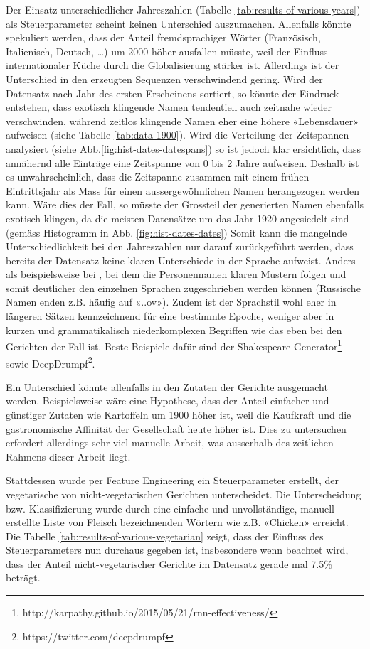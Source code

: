 Der Einsatz unterschiedlicher Jahreszahlen (Tabelle \ref{tab:results-of-various-years}) als Steuerparameter scheint keinen Unterschied auszumachen.
Allenfalls könnte spekuliert werden, dass der Anteil fremdsprachiger Wörter (Französisch, Italienisch, Deutsch, …) um 2000 höher ausfallen müsste,
weil der Einfluss internationaler Küche durch die Globalisierung stärker ist.
Allerdings ist der Unterschied in den erzeugten Sequenzen verschwindend gering.
Wird der Datensatz nach Jahr des ersten Erscheinens sortiert, so könnte der Eindruck entstehen,
dass exotisch klingende Namen tendentiell auch zeitnahe wieder verschwinden, während zeitlos klingende
Namen eher eine höhere «Lebensdauer» aufweisen (siehe Tabelle \ref{tab:data-1900}).
Wird die Verteilung der Zeitspannen analysiert (siehe Abb.\ref{fig:hist-dates-datespans}) so ist jedoch klar ersichtlich,
dass annähernd alle Einträge eine Zeitspanne von 0 bis 2 Jahre aufweisen.
Deshalb ist es unwahrscheinlich, dass die Zeitspanne zusammen mit einem frühen Eintrittsjahr als Mass für einen
aussergewöhnlichen Namen herangezogen werden kann.
Wäre dies der Fall, so müsste der Grossteil der generierten Namen ebenfalls exotisch klingen, da die meisten Datensätze
um das Jahr 1920 angesiedelt sind (gemäss Histogramm in Abb. \ref{fig:hist-dates-dates})
Somit kann die mangelnde Unterschiedlichkeit bei den Jahreszahlen nur darauf zurückgeführt werden, dass bereits
der Datensatz keine klaren Unterschiede in der Sprache aufweist.
Anders als beispielsweise bei \autocite{robertson}, bei dem die Personennamen klaren Mustern folgen und somit deutlicher
den einzelnen Sprachen zugeschrieben werden können (Russische Namen enden z.B. häufig auf «..ov»).
Zudem ist der Sprachstil wohl eher in längeren Sätzen kennzeichnend für eine bestimmte Epoche, weniger aber in kurzen und
grammatikalisch niederkomplexen Begriffen wie das eben bei den Gerichten der Fall ist.
Beste Beispiele dafür sind der Shakespeare-Generator\footnote{http://karpathy.github.io/2015/05/21/rnn-effectiveness/} sowie DeepDrumpf\footnote{https://twitter.com/deepdrumpf}.

Ein Unterschied könnte allenfalls in den Zutaten der Gerichte ausgemacht werden.
Beispielsweise wäre eine Hypothese, dass der Anteil einfacher und günstiger Zutaten wie Kartoffeln um 1900 höher ist, weil
die Kaufkraft und die gastronomische Affinität der Gesellschaft heute höher ist.
Dies zu untersuchen erfordert allerdings sehr viel manuelle Arbeit, was ausserhalb des zeitlichen Rahmens dieser Arbeit liegt.

Stattdessen wurde per Feature Engineering ein Steuerparameter erstellt, der vegetarische von nicht-vegetarischen Gerichten unterscheidet.
Die Unterscheidung bzw. Klassifizierung wurde durch eine einfache und unvollständige, manuell erstellte Liste von Fleisch bezeichnenden Wörtern wie z.B. «Chicken» erreicht.
Die Tabelle \ref{tab:results-of-various-vegetarian} zeigt, dass der Einfluss des Steuerparameters nun durchaus gegeben ist, insbesondere wenn beachtet wird,
dass der Anteil nicht-vegetarischer Gerichte im Datensatz gerade mal 7.5\% beträgt.

